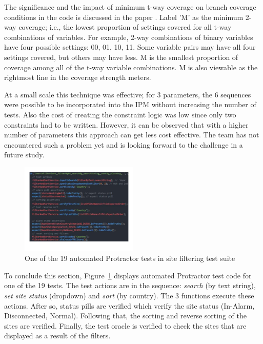 \documentclass[conference]{IEEEtran}
\begin{document}
	The significance and the impact of minimum t-way coverage on branch coverage conditions in the code is discussed in the paper \cite{kuhn2016measuring}.
	Label 'M' as the minimum 2-way coverage; i.e., the lowest proportion of settings covered for all t-way combinations of variables.
	For example, 2-way combinations of binary variables have four possible settings: 00, 01, 10, 11.
	Some variable pairs may have all four settings covered, but others may have less.
	M is the smallest proportion of coverage among all of the t-way variable combinations.
	M is also viewable as the rightmost line in the coverage strength meters.

	At a small scale this technique was effective; for 3 parameters, the 6 sequences were possible to be incorporated into the IPM without increasing the number of tests. 
	Also the cost of creating the constraint logic was low since only two constraints had to be written.
	However, it can be observed that with a higher number of parameters this approach can get less cost effective. 
	The team has not encountered such a problem yet and is looking forward to the challenge in a future study.
	
	\begin{figure}[!h]
		\includegraphics[width=0.50\textwidth,]{sortingTestCode.pdf}
		\caption{One of the 19 automated Protractor tests in site filtering test suite}
		\label{fig:sortingTestCode}
	\end{figure}

	To conclude this section, Figure~\ref{fig:sortingTestCode} displays automated Protractor test code for one of the 19 tests.
	The test actions are in the sequence: \textit{search} (by text string), \textit{set site status} (dropdown) and \textit{sort} (by country). 
	The 3 functions execute these actions.
	After so, status pills are verified which verify the site status (In-Alarm, Disconnected, Normal).
	Following that, the sorting and reverse sorting of the sites are verified.
	Finally, the test oracle is verified to check the sites that are displayed as a result of the filters.
		
\end{document}
